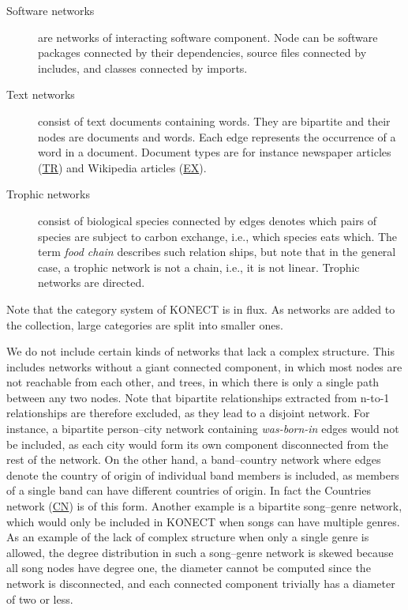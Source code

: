 \documentclass{article}
\begin{document}
\begin{description}
\item[Software networks] are networks of interacting software
  component.  Node can be software packages connected by their
  dependencies, source files connected by includes, and classes
  connected by imports. 

\item[Text networks] consist of text documents containing words.  They
  are bipartite and their nodes are documents and words.  Each edge
  represents the occurrence of a word in a document. Document types are
  for instance
  newspaper articles
  (\href{http://konect.uni-koblenz.de/networks/gottron-trec}{\textsf{TR}})
  and Wikipedia articles
  (\href{http://konect.uni-koblenz.de/networks/gottron-excellent}{\textsf{EX}}). 

\item[Trophic networks] consist of biological species connected by edges denotes
  which pairs of species are subject to carbon exchange, i.e., which
  species eats which.  The term \emph{food chain} describes such
  relation ships, but note that in the general case, a trophic network
  is not a chain, i.e., it is not linear.  Trophic networks are
  directed. 

\end{description}

Note that the category system of KONECT is in flux.  As networks are
added to the collection, large categories are split into smaller ones. 

We do not include certain kinds of networks that lack a complex
structure. This includes networks without a giant connected component,
in which most nodes are not reachable from each other, and trees, in
which there is only a single path between any two nodes.  Note that
bipartite relationships extracted from n-to-1 relationships are
therefore excluded, as they lead to a disjoint network. For instance, a
bipartite person--city network containing \emph{was-born-in} edges would
not be included, as each city would form its own component disconnected
from the rest of the network.  On the other hand, a band--country
network where edges denote the country of origin of individual band
members is included, as members of a single band can have different
countries of origin. In fact the Countries network
(\href{http://konect.uni-koblenz.de/networks/dbpedia-country}{\textsf{CN}})
is of this form.  Another example is a bipartite song--genre network,
which would only be included in KONECT when songs can have multiple
genres.  As an example of the lack of complex structure when only a
single genre is allowed, the degree distribution in such a song--genre
network is skewed because all song nodes have degree one, the diameter
cannot be computed since the network is disconnected, and each connected
component trivially has a diameter of two or less.
\end{document}
